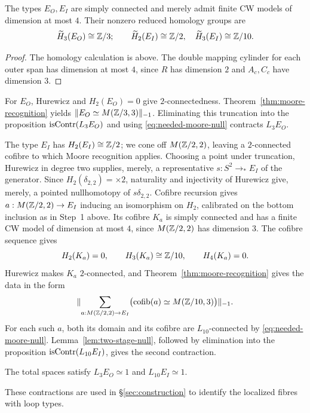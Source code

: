 \begin{proposition}\label{prop:profiles}
The types $E_O,E_I$ are simply connected and merely admit finite CW models of dimension at most $4$. Their nonzero reduced homology groups are
\[
\widetilde H_3(E_O)\cong\mathbb Z/3;\qquad
\widetilde H_2(E_I)\cong\mathbb Z/2,\quad \widetilde H_3(E_I)\cong\mathbb Z/10.
\]
\end{proposition}
\begin{proof}
The homology calculation is above. The double mapping cylinder for each outer span has dimension at most $4$, since $R$ has dimension $2$ and $A_c,C_c$ have dimension $3$.
\end{proof}

For $E_O$, Hurewicz and $H_2(E_O)=0$ give $2$-connectedness. Theorem~\ref{thm:moore-recognition} yields $\lVert E_O\simeq M(\mathbb Z/3,3)\rVert_{-1}$. Eliminating this truncation into the proposition $\operatorname{isContr}(L_3E_O)$ and using \eqref{eq:needed-moore-null} contracts $L_3E_O$.

The type $E_I$ has $H_2(E_I)\cong\mathbb Z/2$; we cone off $M(\mathbb Z/2,2)$, leaving a $2$-connected cofibre to which Moore recognition applies. Choosing a point under truncation, Hurewicz in degree two supplies, merely, a representative $s:S^2\to_*E_I$ of the generator. Since $H_2(\delta_{2,2})=\times2$, naturality and injectivity of Hurewicz give, merely, a pointed nullhomotopy of $s\delta_{2,2}$. Cofibre recursion gives $a:M(\mathbb Z/2,2)\to E_I$ inducing an isomorphism on $H_2$, calibrated on the bottom inclusion as in Step~1 above. Its cofibre $K_a$ is simply connected and has a finite CW model of dimension at most $4$, since $M(\mathbb Z/2,2)$ has dimension $3$. The cofibre sequence gives
\[
H_2(K_a)=0,\qquad H_3(K_a)\cong\mathbb Z/10,\qquad H_4(K_a)=0.
\]
Hurewicz makes $K_a$ $2$-connected, and Theorem~\ref{thm:moore-recognition} gives the data in the form
\begin{equation}\label{eq:EI-profile}
\lVert \sum_{a:M(\mathbb Z/2,2)\to E_I}
             \bigl(\operatorname{cofib}(a)\simeq M(\mathbb Z/10,3)\bigr)\rVert_{-1}.
\end{equation}
For each such $a$, both its domain and its cofibre are $L_{10}$-connected by \eqref{eq:needed-moore-null}. Lemma~\ref{lem:two-stage-null}, followed by elimination into the proposition $\operatorname{isContr}(L_{10}E_I)$, gives the second contraction.

\begin{corollary}\label{cor:local-totals}
The total spaces satisfy $L_3E_O\simeq1$ and $L_{10}E_I\simeq1$.
\end{corollary}
These contractions are used in \S\ref{sec:construction} to identify the localized fibres with loop types.
